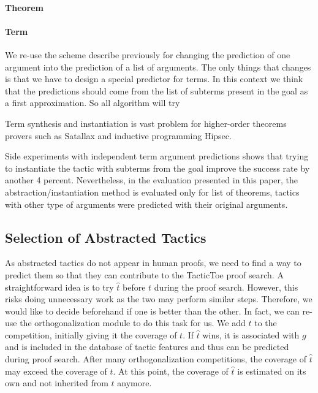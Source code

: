 \documentclass[runningheads,a4paper,draft]{svjour3}
\def\tactictoe{\textsf{TacticToe}\xspace}
\begin{document}
\paragraph{Theorem}





\paragraph{Term}

We re-use the scheme describe previously for changing the prediction of one 
argument into the prediction of a list of arguments.
The only things that changes is that we have to design a special predictor for 
terms. In this context we think that the predictions should come from the list 
of subterms present in the goal as a first approximation. So all algorithm will 
try

Term synthesis and instantiation is vast problem for higher-order theorems 
provers such as Satallax and inductive programming Hipsec.








Side experiments with independent term argument predictions 
shows that trying to instantiate the tactic with subterms from the goal improve 
the success rate by another 4 percent. 
Nevertheless, in the evaluation presented in this paper, the 
abstraction/instantiation 
method is evaluated only for list of 
theorems, tactics with other type of arguments were predicted with their 
original arguments.



\subsection{Selection of Abstracted Tactics}
As abstracted tactics do not appear in human proofs, we need to find a way to
predict them so that they can contribute to the \tactictoe proof search.
A straightforward idea is to try $\hat{t}$ before $t$ during the proof search.
However, this risks doing unnecessary work as the two may perform similar steps.
Therefore, we would like to decide
beforehand if one is better than the other.
In fact, we can re-use the orthogonalization module to do this task for us.
We add $\hat{t}$ to the competition, initially giving it the coverage of $t$.
If $\hat{t}$
wins, it is associated with $g$ and is included in the database of tactic
features and thus can be predicted during proof search.
After many orthogonalization competitions, the coverage of $\hat{t}$ may exceed
the coverage of
$t$. At
this point, the coverage of $\hat{t}$ is estimated on its own and not inherited
from
$t$ anymore.
\end{document}
